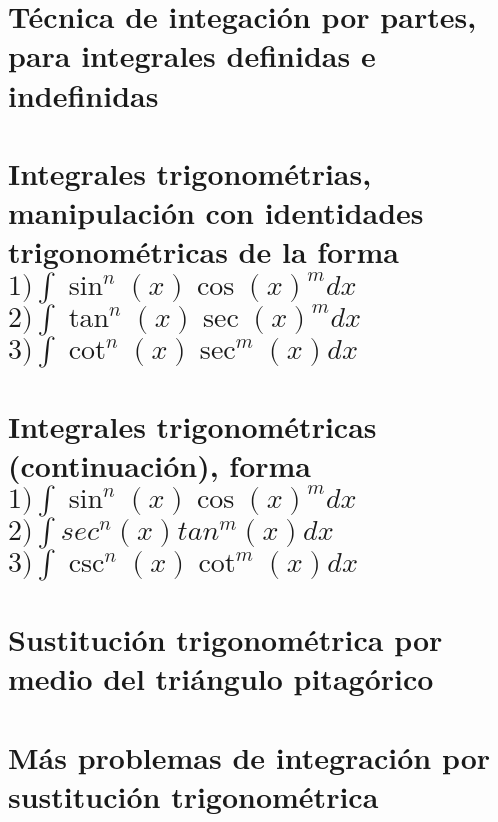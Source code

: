 \documentclass{book}
\begin{document}
\chapter{Técnica de integación por partes, para integrales definidas e indefinidas} 


\chapter{Integrales trigonométrias, manipulación con identidades trigonométricas de la forma \\ $1) \int \sin^n (x) \cos(x)^m dx$ \\ $2) \int \tan ^{n}(x) \sec (x)^{m} dx$ \\ $3) \int \cot^{n} (x)\sec^{m} (x) dx$} 


\chapter{Integrales trigonométricas (continuación), forma \\ $1) \int \sin^n (x) \cos(x)^m dx$ \\ $2) \int sec^n(x) tan^m(x) dx$ \\ $3) \int \csc^{n}(x) \cot^{m} (x)dx$ } 


\chapter{Sustitución trigonométrica por medio del triángulo pitagórico} 


\chapter{Más problemas de integración por sustitución trigonométrica} 

\end{document}

